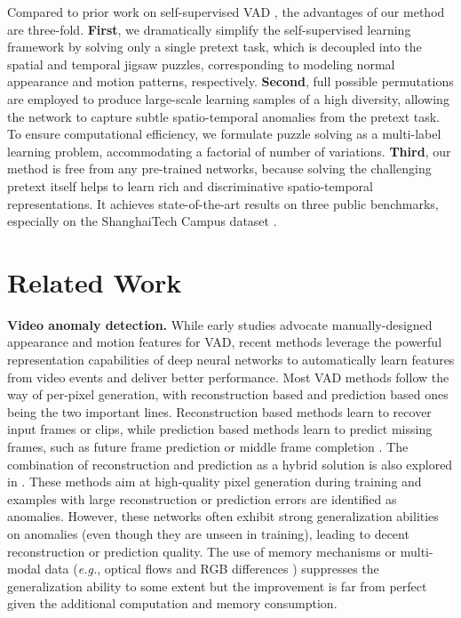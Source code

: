 \documentclass[runningheads]{llncs}
\begin{document}
Compared to prior work on self-supervised VAD \cite{georgescu2021anomaly, wang2020cluster}, the advantages of our method are three-fold. \textbf{First}, we dramatically simplify the self-supervised learning framework by solving only a single pretext task, which is decoupled into the spatial and temporal jigsaw puzzles, corresponding to modeling normal appearance and motion patterns, respectively. \textbf{Second}, full possible permutations are employed to produce large-scale learning samples of a high diversity, allowing the network to capture subtle spatio-temporal anomalies from the pretext task. To ensure computational efficiency, we formulate puzzle solving as a multi-label learning problem, accommodating a factorial of number of variations. \textbf{Third}, our method is free from any pre-trained networks, because solving the challenging pretext itself helps to learn rich and discriminative spatio-temporal representations. It achieves state-of-the-art results on three public benchmarks, especially on the ShanghaiTech Campus dataset \cite{luo2017revisit}.





\section{Related Work}


\textbf{Video anomaly detection.} While early studies \cite{adam2008robust, antic2011video, cong2013abnormal} advocate manually-designed appearance and motion features for VAD, recent methods leverage the powerful representation capabilities of deep neural networks to automatically learn features from video events and deliver better performance. Most VAD methods follow the way of per-pixel generation, with reconstruction based and prediction based ones being the two important lines. Reconstruction based methods \cite{hasan2016learning, luo2017remembering, fan2020video} learn to recover input frames or clips, while prediction based methods learn to predict missing frames, such as future frame prediction \cite{lu2019future, liu2018future, MM21} or middle frame completion \cite{yu2020cloze, lee2019bman}. The combination of reconstruction and prediction as a hybrid solution is also explored in \cite{ye2019anopcn, zhao2017spatio, morais2019learning}.
These methods aim at high-quality pixel generation during training and examples with large reconstruction or prediction errors are identified as anomalies.
However, these networks often exhibit strong generalization abilities on anomalies (even though they are unseen in training), leading to decent reconstruction or prediction quality. The use of memory mechanisms \cite{gong2019memorizing, park2020learning} or multi-modal data (\emph{e.g.}, optical flows \cite{liu2021hybrid, nguyen2019anomaly} and RGB differences \cite{chang2020clustering}) suppresses the generalization ability to some extent but the improvement is far from perfect given the additional computation and memory consumption. 
\end{document}

